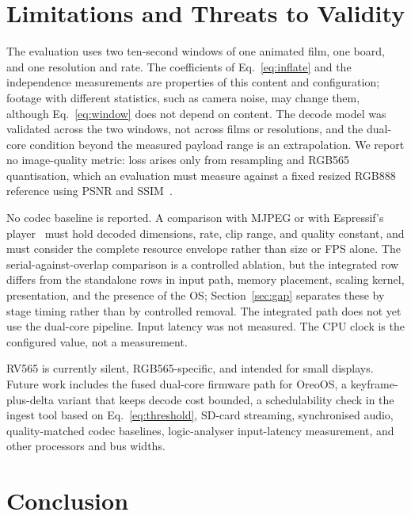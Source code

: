\documentclass[11pt,twocolumn]{article}
\newcommand{\system}{RV565}
\begin{document}
\section{Limitations and Threats to Validity}

The evaluation uses two ten-second windows of one animated film, one board,
and one resolution and rate.  The coefficients of Eq.~\eqref{eq:inflate} and
the independence measurements are properties of this content and
configuration; footage with different statistics, such as camera noise, may
change them, although Eq.~\eqref{eq:window} does not depend on content.  The
decode model was validated across the two windows, not across films or
resolutions, and the dual-core condition beyond the measured payload range is
an extrapolation.  We report no image-quality metric: loss arises only from
resampling and RGB565 quantisation, which an evaluation must measure against
a fixed resized RGB888 reference using PSNR and SSIM~\cite{wang2004image}.

No codec baseline is reported.  A comparison with MJPEG or with Espressif's
player~\cite{espressif2026player} must hold decoded dimensions, rate, clip
range, and quality constant, and must consider the complete resource envelope
rather than size or FPS alone.  The serial-against-overlap comparison is a
controlled ablation, but the integrated row differs from the standalone rows
in input path, memory placement, scaling kernel, presentation, and the
presence of the OS; Section~\ref{sec:gap} separates these by stage timing
rather than by controlled removal.  The integrated path does not yet use the
dual-core pipeline.  Input latency was not measured.  The CPU clock is the
configured value, not a measurement.

\system{} is currently silent, RGB565-specific, and intended for small
displays.  Future work includes the fused dual-core firmware path for OreoOS,
a keyframe-plus-delta variant that keeps decode cost bounded, a
schedulability check in the ingest tool based on Eq.~\eqref{eq:threshold},
SD-card streaming, synchronised audio, quality-matched codec baselines,
logic-analyser input-latency measurement, and other processors and bus
widths.

\section{Conclusion}
\end{document}
